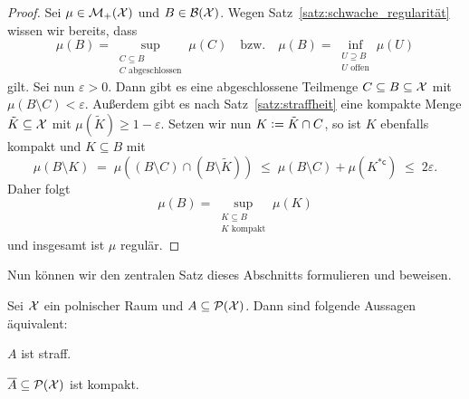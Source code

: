 \documentclass[../thesis/thesis.tex]{subfiles}
\begin{document}
	\begin{proof}
		Sei $\mu \in \mathcal{M}_{+}(\mathcal{X})$ und $B \in \mathcal{B}(\mathcal{X})$. 
		Wegen Satz~\ref{satz:schwache_regularität} wissen wir bereits, dass 
		\[\mu(B) = \sup_{\substack{C \subseteq B \\ C \text{ abgeschlossen}}} \mu(C) 
		\quad \text{bzw.} \quad \mu(B) = \inf_{\substack{U \supseteq B \\ U \text{ offen}}} 
		\mu(U)\]
		gilt. Sei nun $\varepsilon > 0$. Dann gibt es eine abgeschlossene Teilmenge 
		$C \subseteq B \subseteq \mathcal{X}$ mit $\mu(B \setminus C) < \varepsilon$. 
		Außerdem gibt es nach Satz~\ref{satz:straffheit} eine kompakte Menge 
		$\tilde{K} \subseteq \mathcal{X}$ mit $\mu(\tilde{K}) \geq 1 - \varepsilon$. Setzen 
		wir nun $K \vcentcolon = \tilde{K} \cap C$, so ist $K$ ebenfalls kompakt und 
		$K \subseteq B$ mit 
		\[ \mu(B \setminus K) 
		\; = \; \mu((B \setminus C) \cap (B \setminus \tilde{K})) 
		\; \leq \; \mu(B \setminus C) + \mu(K^{\ast \mathsf{c}}) 
		\; \leq \; 2 \varepsilon \text{.} \]
		Daher folgt 
		\[\mu(B) 
		= \sup_{\substack{K \subseteq B \\ K \text{ kompakt}}} \mu(K)\] 
		und insgesamt ist $\mu$ regulär.
	\end{proof}
	
	Nun können wir den zentralen Satz dieses Abschnitts formulieren und beweisen.
	
	\begin{Satz}[Prokhorov]
		\label{satz:prokhorov}
		Sei $\mathcal{X}$ ein polnischer Raum und $A \subseteq \mathcal{P}(\mathcal{X})$. Dann sind folgende Aussagen äquivalent:
		\begin{equivalentthm}
			\item $A$ ist straff.
			\item $\overline{A} \subseteq \mathcal{P}(\mathcal{X})$ ist kompakt.
		\end{equivalentthm}
	\end{Satz}
	
\end{document}
